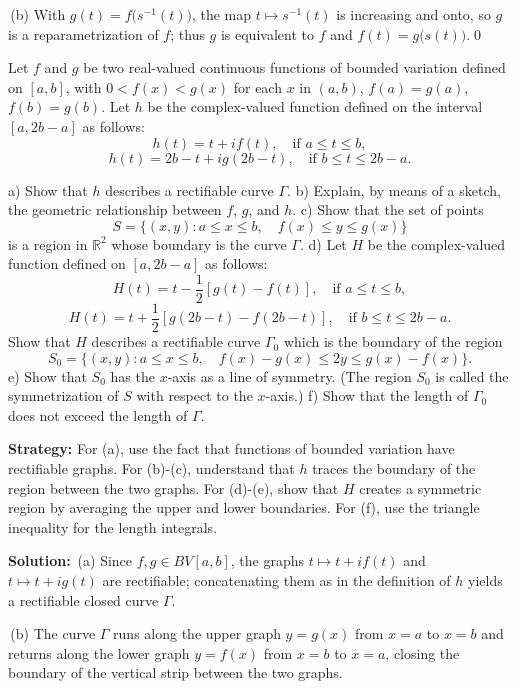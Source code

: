 \,(b) With $g(t)=f\big(s^{-1}(t)\big)$, the map $t\mapsto s^{-1}(t)$ is increasing and onto, so $g$ is a reparametrization of $f$; thus $g$ is equivalent to $f$ and $f(t)=g\big(s(t)\big)$.\qed


\begin{problembox}
Let $f$ and $g$ be two real-valued continuous functions of bounded variation defined on $[a, b]$, with $0 < f(x) < g(x)$ for each $x$ in $(a, b)$, $f(a) = g(a)$, $f(b) = g(b)$. Let $h$ be the complex-valued function defined on the interval $[a, 2b - a]$ as follows:
\[h(t) = t + i f(t), \quad \text{if } a \leq t \leq b,\]
\[h(t) = 2b - t + ig(2b - t), \quad \text{if } b \leq t \leq 2b - a.\]

a) Show that $h$ describes a rectifiable curve $\Gamma$.
b) Explain, by means of a sketch, the geometric relationship between $f$, $g$, and $h$.
c) Show that the set of points
\[S = \{ (x, y) : a \leq x \leq b, \quad f(x) \leq y \leq g(x) \}\]
is a region in $\mathbb{R}^2$ whose boundary is the curve $\Gamma$.
d) Let $H$ be the complex-valued function defined on $[a, 2b - a]$ as follows:
\[H(t) = t - \frac{1}{2} [g(t) - f(t)], \quad \text{if } a \leq t \leq b,\]
\[H(t) = t + \frac{1}{2} [g(2b - t) - f(2b - t)], \quad \text{if } b \leq t \leq 2b - a.\]
Show that $H$ describes a rectifiable curve $\Gamma_0$ which is the boundary of the region
\[S_0 = \{ (x, y) : a \leq x \leq b, \quad f(x) - g(x) \leq 2y \leq g(x) - f(x) \}.\]
e) Show that $S_0$ has the $x$-axis as a line of symmetry. (The region $S_0$ is called the symmetrization of $S$ with respect to the $x$-axis.)
f) Show that the length of $\Gamma_0$ does not exceed the length of $\Gamma$.
\end{problembox}

\noindent\textbf{Strategy:} For (a), use the fact that functions of bounded variation have rectifiable graphs. For (b)-(c), understand that $h$ traces the boundary of the region between the two graphs. For (d)-(e), show that $H$ creates a symmetric region by averaging the upper and lower boundaries. For (f), use the triangle inequality for the length integrals.

\bigskip\noindent\textbf{Solution:}
\,(a) Since $f,g\in BV[a,b]$, the graphs $t\mapsto t+if(t)$ and $t\mapsto t+ig(t)$ are rectifiable; concatenating them as in the definition of $h$ yields a rectifiable closed curve $\Gamma$.

\,(b) The curve $\Gamma$ runs along the upper graph $y=g(x)$ from $x=a$ to $x=b$ and returns along the lower graph $y=f(x)$ from $x=b$ to $x=a$, closing the boundary of the vertical strip between the two graphs.

